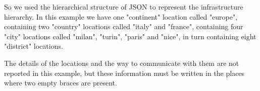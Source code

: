 So we used the hierarchical structure of JSON to represent the infrastructure hierarchy. In this example we have one "continent" location called "europe", containing two "country" locations called "italy" and "france", containing four "city" locations called "milan", "turin", "paris" and "nice", in turn containing eight "district" locations.

The details of the locations and the way to communicate with them are not reported in this example, but these information must be written in the places where two empty braces \inlinecode{\{ \}} are present.